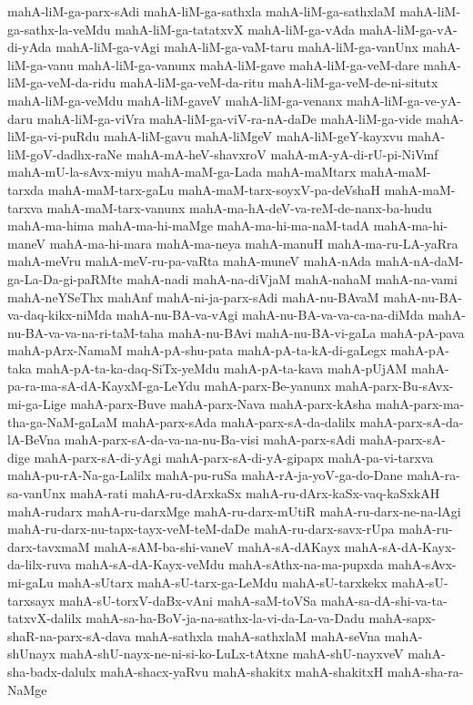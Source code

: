 {mahA-liM-ga-parx-sAdi
mahA-liM-ga-sathxla
mahA-liM-ga-sathxlaM
mahA-liM-ga-sathx-la-veMdu
mahA-liM-ga-tatatxvX
mahA-liM-ga-vAda
mahA-liM-ga-vA-di-yAda
mahA-liM-ga-vAgi
mahA-liM-ga-vaM-taru
mahA-liM-ga-vanUnx
mahA-liM-ga-vanu
mahA-liM-ga-vanunx
mahA-liM-gave
mahA-liM-ga-veM-dare
mahA-liM-ga-veM-da-ridu
mahA-liM-ga-veM-da-ritu
mahA-liM-ga-veM-de-ni-situtx
mahA-liM-ga-veMdu
mahA-liM-gaveV
mahA-liM-ga-venanx
mahA-liM-ga-ve-yA-daru
mahA-liM-ga-viVra
mahA-liM-ga-viV-ra-nA-daDe
mahA-liM-ga-vide
mahA-liM-ga-vi-puRdu
mahA-liM-gavu
mahA-liMgeV
mahA-liM-geY-kayxvu
mahA-liM-goV-dadhx-raNe
mahA-mA-heV-shavxroV
mahA-mA-yA-di-rU-pi-NiVmf
mahA-mU-la-sAvx-miyu
mahA-maM-ga-Lada
mahA-maMtarx
mahA-maM-tarxda
mahA-maM-tarx-gaLu
mahA-maM-tarx-soyxV-pa-deVshaH
mahA-maM-tarxva
mahA-maM-tarx-vanunx
mahA-ma-hA-deV-va-reM-de-nanx-ba-hudu
mahA-ma-hima
mahA-ma-hi-maMge
mahA-ma-hi-ma-naM-tadA
mahA-ma-hi-maneV
mahA-ma-hi-mara
mahA-ma-neya
mahA-manuH
mahA-ma-ru-LA-yaRra
mahA-meVru
mahA-meV-ru-pa-vaRta
mahA-muneV
mahA-nAda
mahA-nA-daM-ga-La-Da-gi-paRMte
mahA-nadi
mahA-na-diVjaM
mahA-nahaM
mahA-na-vami
mahA-neYSeThx
mahAnf
mahA-ni-ja-parx-sAdi
mahA-nu-BAvaM
mahA-nu-BA-va-daq-kikx-niMda
mahA-nu-BA-va-vAgi
mahA-nu-BA-va-va-ca-na-diMda
mahA-nu-BA-va-va-na-ri-taM-taha
mahA-nu-BAvi
mahA-nu-BA-vi-gaLa
mahA-pA-pava
mahA-pArx-NamaM
mahA-pA-shu-pata
mahA-pA-ta-kA-di-gaLegx
mahA-pA-taka
mahA-pA-ta-ka-daq-SiTx-yeMdu
mahA-pA-ta-kava
mahA-pUjAM
mahA-pa-ra-ma-sA-dA-KayxM-ga-LeYdu
mahA-parx-Be-yanunx
mahA-parx-Bu-sAvx-mi-ga-Lige
mahA-parx-Buve
mahA-parx-Nava
mahA-parx-kAsha
mahA-parx-ma-tha-ga-NaM-gaLaM
mahA-parx-sAda
mahA-parx-sA-da-dalilx
mahA-parx-sA-da-lA-BeVna
mahA-parx-sA-da-va-na-nu-Ba-visi
mahA-parx-sAdi
mahA-parx-sA-dige
mahA-parx-sA-di-yAgi
mahA-parx-sA-di-yA-gipapx
mahA-pa-vi-tarxva
mahA-pu-rA-Na-ga-Lalilx
mahA-pu-ruSa
mahA-rA-ja-yoV-ga-do-Dane
mahA-ra-sa-vanUnx
mahA-rati
mahA-ru-dArxkaSx
mahA-ru-dArx-kaSx-vaq-kaSxkAH
mahA-rudarx
mahA-ru-darxMge
mahA-ru-darx-mUtiR
mahA-ru-darx-ne-na-lAgi
mahA-ru-darx-nu-tapx-tayx-veM-teM-daDe
mahA-ru-darx-savx-rUpa
mahA-ru-darx-tavxmaM
mahA-sAM-ba-shi-vaneV
mahA-sA-dAKayx
mahA-sA-dA-Kayx-da-lilx-ruva
mahA-sA-dA-Kayx-veMdu
mahA-sAthx-na-ma-pupxda
mahA-sAvx-mi-gaLu
mahA-sUtarx
mahA-sU-tarx-ga-LeMdu
mahA-sU-tarxkekx
mahA-sU-tarxsayx
mahA-sU-torxV-daBx-vAni
mahA-saM-toVSa
mahA-sa-dA-shi-va-ta-tatxvX-dalilx
mahA-sa-ha-BoV-ja-na-sathx-la-vi-da-La-va-Dadu
mahA-sapx-shaR-na-parx-sA-dava
mahA-sathxla
mahA-sathxlaM
mahA-seVna
mahA-shUnayx
mahA-shU-nayx-ne-ni-si-ko-LuLx-tAtxne
mahA-shU-nayxveV
mahA-sha-badx-dalulx
mahA-shacx-yaRvu
mahA-shakitx
mahA-shakitxH
mahA-sha-ra-NaMge
}
